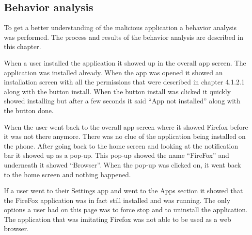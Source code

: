 \subsection{Behavior analysis}
To get a better understanding of the malicious application a behavior analysis was performed. The process and results of the behavior analysis are described in this chapter.

When a user installed the application it showed up in the overall app screen. The application was installed already. When the app was opened it showed an installation screen with all the permissions that were described in chapter 4.1.2.1 along with the button install. When the button install was clicked it quickly showed installing but after a few seconds it said “App not installed” along with the button done. 

When the user went back to the overall app screen where it showed Firefox before it was not there anymore. There was no clue of the application being installed on the phone. After going back to the home screen and looking at the notification bar it showed up as a pop-up. This pop-up showed the name “FireFox” and underneath it showed “Browser”. When the pop-up was clicked on, it went back to the home screen and nothing happened.

If a user went to their Settings app and went to the Apps section it showed that the FireFox application was in fact still installed and was running. The only options a user had on this page was to force stop and to uninstall the application. The application that was imitating Firefox was not able to be used as a web browser.